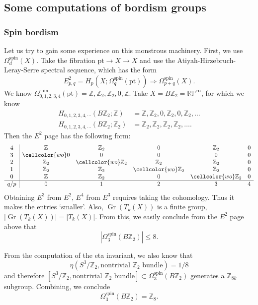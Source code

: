 \documentclass[12pt]{article}
\numberwithin{equation}{section}
\numberwithin{figure}{section}
\theoremstyle{remark}
\def\bZ{\mathbb{Z}}
\def\RP{\mathbb{RP}}
\def\pt{\mathrm{pt}}
\def\Gr{\mathop{\mathrm{Gr}}}
\begin{document}
\subsection{Some computations of bordism groups}



\subsubsection{Spin bordism}
Let us try to gain some experience on this monstrous machinery. 
First, we use $\Omega^\text{spin}_d(X)$.
Take the fibration $\pt \to X\to X$ and use the Atiyah-Hirzebruch-Leray-Serre spectral sequence,
which has the form \begin{equation}
E^2_{p,q}=H_p(X;\Omega^\text{spin}_q(\pt)) \Rightarrow \Omega^\text{spin}_{p+q}(X).
\end{equation}
We know $\Omega^\text{spin}_{0,1,2,3,4}(\pt)=\bZ,\bZ_2,\bZ_2,0,\bZ$.
Take $X=B\bZ_2=\RP^\infty$, for which we know
\begin{align}
H_{0,1,2,3,4,\cdots}(B\bZ_2;\bZ)&=\bZ,\bZ_2,0,\bZ_2,0,\bZ_2,\ldots\\
H_{0,1,2,3,4,\cdots}(B\bZ_2;\bZ_2)&=\bZ_2,\bZ_2,\bZ_2,\bZ_2,\ldots.
\end{align}
Then the $E^2$ page has the following form:
\begin{equation}
\begin{array}{c|cccccccccc}
4 & \bZ & \bZ_2 & 0 & \bZ_2 & 0  \\
3 & \cellcolor{wo}0 & 0 &0 & 0 &0 \\
2 & \bZ_2 & \cellcolor{wo}\bZ_2 &\bZ_2 & \bZ_2 &0  \\
1 & \bZ_2 & \bZ_2 &\cellcolor{wo}\bZ_2 & \bZ_2 &0 \\
0 & \bZ & \bZ_2 & 0 &\cellcolor{wo} \bZ_2 &0 \\
\hline
q/p & 0 & 1 & 2 & 3 & 4 
\end{array}
\end{equation}
Obtaining $E^3$ from $E^2$, $E^4$ from $E^3$ 
requires taking the cohomology. Thus it makes the entries `smaller'.
Also, $\Gr(T_k(X))$ is a finite group, $|\Gr(T_k(X))|=|T_k(X)|$.
From this, we easily conclude from the $E^2$ page above that \begin{equation}
|\Omega^\text{spin}_3(B\bZ_2)| \le 8.
\end{equation}

From the computation of the eta invariant, we also know that 
\begin{equation}
\eta(S^3/\bZ_2,\text{nontrivial $\bZ_2$ bundle}) = 1/8
\end{equation} and therefore 
$[S^3/\bZ_2,\text{nontrivial $\bZ_2$ bundle}] \subset \Omega^\text{spin}_3(B\bZ_2) $  generates 
a $\bZ_{8k}$ subgroup.
Combining, we conclude \begin{equation}
\Omega^\text{spin}_3(B\bZ_2) =\bZ_8.
\end{equation}
\end{document}
